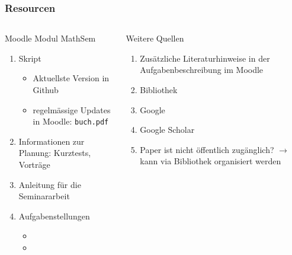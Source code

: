 %
%
%
\begin{frame}[t]
\frametitle{Resourcen}
\begin{columns}[t,onlytextwidth]
\begin{column}{0.48\textwidth}
\begin{block}{Moodle Modul MathSem}
\begin{enumerate}
\item Skript
\begin{itemize}
\item Aktuellste Version in Github
\item regelmässige Updates in Moodle: \texttt{buch.pdf}
\end{itemize}
\item Informationen zur Planung: Kurztests, Vorträge
\item Anleitung für die Seminararbeit
\item Aufgabenstellungen
\begin{itemize}
\item
\item
\end{itemize}
\end{enumerate}
\end{block}
\end{column}
\begin{column}{0.48\textwidth}
\begin{block}{Weitere Quellen}
\begin{enumerate}
\item Zusätzliche Literaturhinweise in der Aufgabenbeschreibung im Moodle
\item Bibliothek
\item Google
\item Google Scholar
\item Paper ist nicht öffentlich zugänglich? $\rightarrow$ kann via
Bibliothek organisiert werden
\end{enumerate}
\end{block}
\end{column}
\end{columns}
\end{frame}

